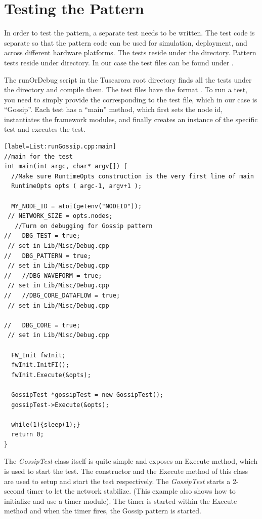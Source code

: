 \section {Testing the Pattern}

In order to test the pattern, a separate test needs to be written.
The test code is separate so that the pattern
code can be used for simulation, deployment, and across
different hardware platforms. The tests reside under the
 directory.  Pattern tests reside under
 directory. In our
case the test files can be found under .

The runOrDebug script in the Tuscarora root directory finds all the
tests under the  directory and compile them. 
The test files have the format . 
To run a test, you need to simply provide the  
corresponding to the test file,
which in our case is ``Gossip''. 
Each test has a
``main'' method, which first sets the node id, instantiates the framework
modules, and finally creates an instance of the specific test and
executes the test.

\begin{lstlisting}[style=boralargefile] [label=List:runGossip.cpp:main]
//main for the test
int main(int argc, char* argv[]) {
  //Make sure RuntimeOpts construction is the very first line of main
  RuntimeOpts opts ( argc-1, argv+1 );
  
  MY_NODE_ID = atoi(getenv("NODEID"));
 // NETWORK_SIZE = opts.nodes;
   //Turn on debugging for Gossip pattern
//   DBG_TEST = true;
 // set in Lib/Misc/Debug.cpp
//   DBG_PATTERN = true;
 // set in Lib/Misc/Debug.cpp
//   //DBG_WAVEFORM = true;
 // set in Lib/Misc/Debug.cpp
//   //DBG_CORE_DATAFLOW = true;
 // set in Lib/Misc/Debug.cpp

//   DBG_CORE = true;
 // set in Lib/Misc/Debug.cpp

  FW_Init fwInit;
  fwInit.InitFI();
  fwInit.Execute(&opts);
  
  GossipTest *gossipTest = new GossipTest();
  gossipTest->Execute(&opts);

  while(1){sleep(1);}
  return 0;
}
\end{lstlisting}

The \emph{GossipTest} class itself is quite simple and exposes an
Execute method, which is used to start the test. 
The constructor and the Execute method of this class are used to setup and
start the test respectively. 
The \emph{GossipTest} starts a 2-second timer to let the network stabilize. (This example also shows how to initialize and use a timer module). The timer is started within the Execute method and when the timer fires, the Gossip pattern is started. 

